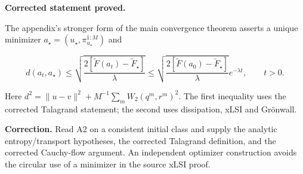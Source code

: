\documentclass[11pt,a4paper]{report}
\begin{document}
\textbf{Corrected statement proved.}



The appendix's stronger form of the main
        convergence theorem asserts a unique minimizer
        \(a_\star=(u_\star,\pi_{u_\star}^{1:M})\) and


        \[d(a_t,a_\star)\le
          \sqrt{\frac{2[\widetilde F(a_t)-\widetilde F_\star]}\lambda}
          \le\sqrt{\frac{2[\widetilde F(a_0)-\widetilde F_\star]}\lambda}
             e^{-\lambda t},\qquad t>0.\]


Here \(d^2=\|u-v\|^2+M^{-1}\sum_mW_2(q^m,r^m)^2\). The first
        inequality uses the corrected Talagrand statement; the second uses
        dissipation, xLSI and Grönwall.



\textbf{Correction.} Read A2 on a consistent initial class and supply the analytic entropy/\allowbreak{}transport hypotheses, the corrected Talagrand definition, and the corrected Cauchy-flow argument. An independent optimizer construction avoids the circular use of a minimizer in the source xLSI proof.
\end{document}
